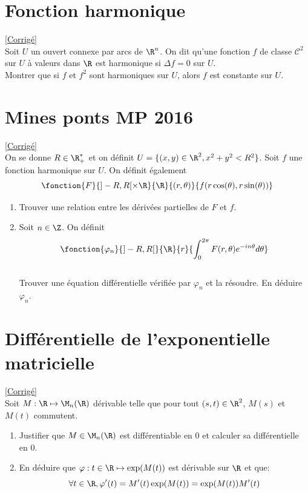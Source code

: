 \documentclass{book}
\begin{document}
\section{Fonction harmonique}
\label{Fonction harmoinique}
\textcolor{blue}{\hyperref[sec:fonction-harmonique]{[Corrigé]}}\\
Soit $U$ un ouvert connexe par arcs de $\R^n$. On dit qu'une fonction $f$ de classe $\mathcal{C}^2$ sur $U$ à valeurs dans $\R$ est harmonique si $\Delta f=0$ sur $U$.
\\ Montrer que si $f$ et $f^2$ sont harmoniques sur $U$, alors $f$ est constante sur $U$.

\section{Mines ponts MP 2016}
\label{Mines ponts MP 2016}
\textcolor{blue}{\hyperref[sec:mines-ponts-mp-2016]{[Corrigé]}}\\
On se donne $R\in\R_+^*$ et on définit $U=\{(x,y)\in\R^2, x^2+y^2<R^2\}$. Soit $f$ une fonction harmonique sur $U$. On définit également $$\fonction{F}{]-R,R[\times \R}{\R}{(r,\theta)}{f(r\cos(\theta),r\sin(\theta))}$$
\begin{enumerate}
	\item Trouver une relation entre les dérivées partielles de $F$ et $f$.
	\item Soit $n\in\Z$. On définit $$\fonction{\varphi_n}{]-R,R[}{\R}{r}{\displaystyle\int_0^{2\pi}F(r,\theta)e^{-in\theta}d\theta}$$
	\\Trouver une équation différentielle vérifiée par $\varphi_n$ et la résoudre. En déduire $\varphi_n$.
\end{enumerate}

\section{Différentielle de l'exponentielle matricielle}
\label{Différentielle de l'exponentielle matricielle}
\textcolor{blue}{\hyperref[sec:differentielle-de-la-norme-euclidienne]{[Corrigé]}}\\
Soit $M:\R\mapsto\M_n(\R)$ dérivable telle que pour tout $(s,t)\in\R^2$, $M(s)$ et $M(t)$ commutent.
\begin{enumerate}
	\item Justifier que $M\in\M_n(\R)$ est différentiable en 0 et calculer sa différentielle en 0.
	\item En déduire que $\varphi:t\in\R\mapsto \exp(M(t))$ est dérivable sur $\R$ et que: $$\forall t\in\R, \varphi'(t)=M'(t)\exp(M(t))=\exp(M(t))M'(t)$$
\end{enumerate}
\end{document}

